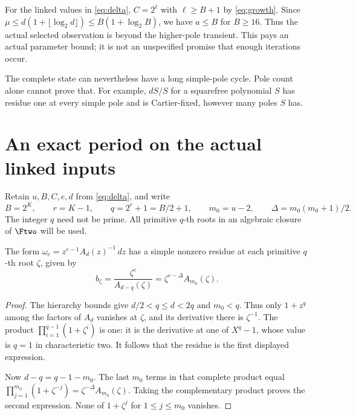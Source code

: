 \documentclass[11pt]{article}
\begin{document}
For the linked values in \eqref{eq:delta}, $C=2^\ell$ with
$\ell\ge B+1$ by \eqref{eq:growth}. Since
$\mu\le d(1+\lfloor\log_2 d\rfloor)\le B(1+\log_2B)$,
we have $a\le B$ for $B\ge16$. Thus the actual selected observation
is beyond the higher-pole transient. This pays an actual parameter
bound; it is not an unspecified promise that enough iterations occur.

The complete state can nevertheless have a long simple-pole cycle.
Pole count alone cannot prove that. For example, $dS/S$ for a
squarefree polynomial $S$ has residue one at every simple pole and
is Cartier-fixed, however many poles $S$ has.

\section{An exact period on the actual linked inputs}

Retain $u,B,C,e,d$ from \eqref{eq:delta}, and write
\[
 B=2^K,\qquad r=K-1,\qquad q=2^r+1=B/2+1,\qquad
 m_0=u-2,\qquad \Delta=m_0(m_0+1)/2.
\]
The integer $q$ need not be prime. All primitive $q$-th roots
in an algebraic closure of $\Ftwo$ will be used.

\begin{lemma}\label{lem:residue}
The form $\omega_e=z^{e-1}A_d(z)^{-1}\,dz$ has a simple nonzero
residue at each primitive $q$-th root $\zeta$, given by
\[
 b_\zeta=\frac{\zeta^e}{A_{d-q}(\zeta)}
                 =\zeta^{e-\Delta}A_{m_0}(\zeta).
\]
\end{lemma}
\begin{proof}
The hierarchy bounds give $d/2<q\le d<2q$ and $m_0<q$.
Thus only $1+z^q$ among the factors of $A_d$ vanishes at
$\zeta$, and its derivative there is $\zeta^{-1}$.
The product $\prod_{i=1}^{q-1}(1+\zeta^i)$ is one: it is
the derivative at one of $X^q-1$, whose value is $q=1$ in
characteristic two. It follows that the residue is the first
displayed expression.

Now $d-q=q-1-m_0$. The last $m_0$ terms in that complete
product equal
$\prod_{j=1}^{m_0}(1+\zeta^{-j})
  =\zeta^{-\Delta}A_{m_0}(\zeta)$.
Taking the complementary product proves the second expression.
None of $1+\zeta^j$ for $1\le j\le m_0$ vanishes.
\end{proof}
\end{document}
